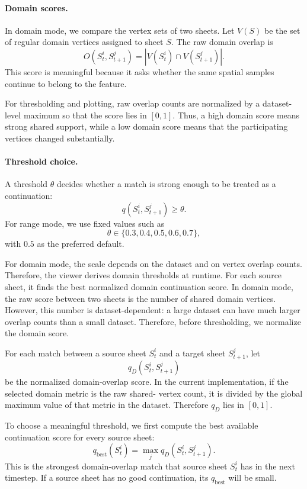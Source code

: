   \paragraph{Domain scores.}
  In domain mode, we compare the vertex sets of two sheets. Let $V(S)$ be the set of regular domain vertices assigned to
  sheet $S$. The raw domain overlap is
  \[
  O(S_t^i,S_{t+1}^j)
  =
  |V(S_t^i)\cap V(S_{t+1}^j)|.
  \]
  This score is meaningful because it asks whether the same spatial samples continue to belong to the feature.

  For thresholding and plotting, raw overlap counts are normalized by a dataset-level maximum so that the score lies in
  $[0,1]$. Thus, a high domain score means strong shared support, while a low domain score means that the participating
  vertices changed substantially.

  \paragraph{Threshold choice.}
  A threshold $\theta$ decides whether a match is strong enough to be treated as a continuation:
  \[
  q(S_t^i,S_{t+1}^j) \geq \theta.
  \]
  For range mode, we use fixed values such as
  \[
  \theta \in \{0.3,0.4,0.5,0.6,0.7\},
  \]
  with $0.5$ as the preferred default.

  For domain mode, the scale depends on the dataset and on vertex overlap counts. Therefore, the viewer derives domain
  thresholds at runtime. For each source sheet, it finds the best normalized domain continuation score. In domain mode, the raw score between two sheets is the number of shared domain vertices. However, this number is
  dataset-dependent: a large dataset can have much larger overlap counts than a small dataset. Therefore, before
  thresholding, we normalize the domain score.

  For each match between a source sheet $S_t^i$ and a target sheet $S_{t+1}^j$, let
  \[
  q_D(S_t^i,S_{t+1}^j)
  \]
  be the normalized domain-overlap score. In the current implementation, if the selected domain metric is the raw shared-
  vertex count, it is divided by the global maximum value of that metric in the dataset. Therefore $q_D$ lies in $[0,1]$.

  To choose a meaningful threshold, we first compute the best available continuation score for every source sheet:
  \[
  q_{\mathrm{best}}(S_t^i)
  =
  \max_j q_D(S_t^i,S_{t+1}^j).
  \]
  This is the strongest domain-overlap match that source sheet $S_t^i$ has in the next timestep. If a source sheet has no
  good continuation, its $q_{\mathrm{best}}$ will be small.

